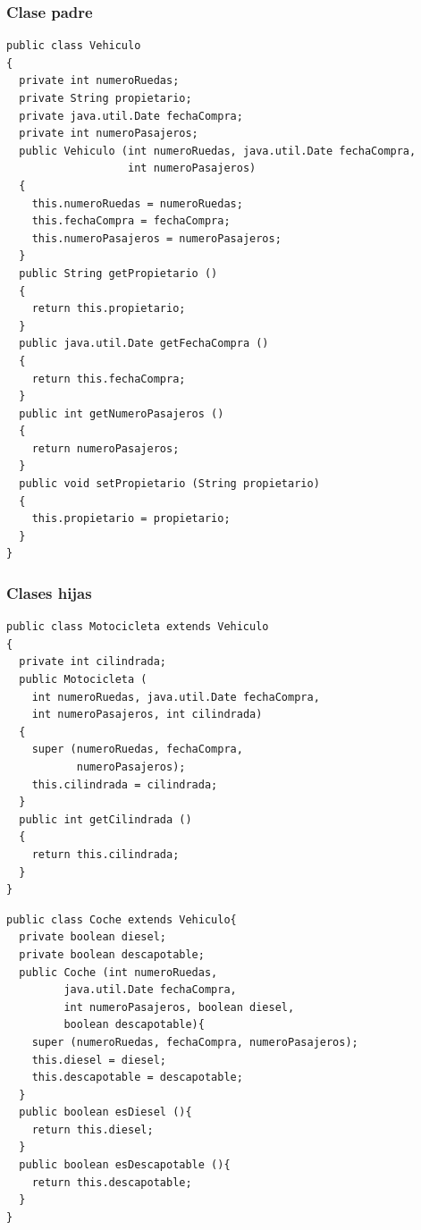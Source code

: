 \documentclass{beamer}
\begin{document}
\begin{frame}[fragile]
\frametitle{Clase padre} 
\begin{tiny}
\begin{verbatim}
public class Vehiculo
{
  private int numeroRuedas;
  private String propietario;
  private java.util.Date fechaCompra;
  private int numeroPasajeros;
  public Vehiculo (int numeroRuedas, java.util.Date fechaCompra,
                   int numeroPasajeros)
  {
    this.numeroRuedas = numeroRuedas;
    this.fechaCompra = fechaCompra;
    this.numeroPasajeros = numeroPasajeros;
  }
  public String getPropietario ()
  {
    return this.propietario;
  }
  public java.util.Date getFechaCompra ()
  {
    return this.fechaCompra;
  }
  public int getNumeroPasajeros ()
  {
    return numeroPasajeros;
  }
  public void setPropietario (String propietario)
  {
    this.propietario = propietario;
  }
}
\end{verbatim}
\end{tiny}
\end{frame}


\begin{frame}[fragile]
    \frametitle{Clases hijas}
\begin{tiny}
\begin{multicols}{2}
\begin{verbatim}
public class Motocicleta extends Vehiculo
{
  private int cilindrada;
  public Motocicleta (
    int numeroRuedas, java.util.Date fechaCompra,
    int numeroPasajeros, int cilindrada)
  {
    super (numeroRuedas, fechaCompra,
           numeroPasajeros);
    this.cilindrada = cilindrada;
  }
  public int getCilindrada ()
  {
    return this.cilindrada;
  }
}

\end{verbatim}
\begin{verbatim}
public class Coche extends Vehiculo{
  private boolean diesel;
  private boolean descapotable;
  public Coche (int numeroRuedas, 
         java.util.Date fechaCompra,
         int numeroPasajeros, boolean diesel, 
         boolean descapotable){
    super (numeroRuedas, fechaCompra, numeroPasajeros);
    this.diesel = diesel;
    this.descapotable = descapotable;
  }
  public boolean esDiesel (){
    return this.diesel;
  }
  public boolean esDescapotable (){
    return this.descapotable;
  }
}
\end{verbatim}
\end{multicols}
\end{tiny}
\end{frame}
\end{document}
